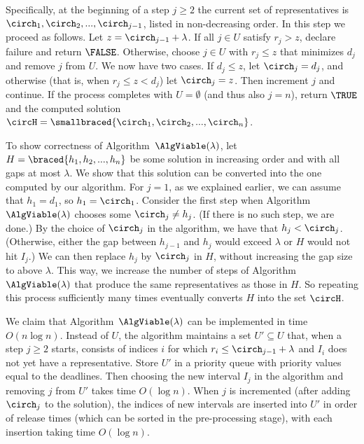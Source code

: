 Specifically, at the beginning of a step $j\ge 2$ the current set of representatives is
$\circh_1,\circh_2,...,\circh_{j-1}$, listed in non-decreasing order. In this step we proceed as follows. 
Let $z = \circh_{j-1} + \lambda$. If all $j\in U$ satisfy $r_j > z$, declare failure and return $\FALSE$.
Otherwise, choose $j\in U$ with $r_j \le z$ that minimizes $d_j$ and remove $j$ from $U$.
We now have two cases. If $d_j \le z$, let $\circh_j = d_j$, and otherwise
(that is, when $r_j \le z < d_j$) let $\circh_j = z$. Then increment $j$ and continue.
If the process completes with $U = \emptyset$ (and thus also $j=n$),
return $\TRUE$ and the computed solution $\circH = \smallbraced{\circh_1,\circh_2,...,\circh_n}$.



\medskip

To show correctness of Algorithm~$\AlgViable(\lambda)$,
let $H = \braced{ h_1, h_2, ..., h_n}$ be some solution in increasing order and
with all gaps at most $\lambda$. We show that this solution can be converted into the one computed by our algorithm.
For $j=1$, as we explained earlier, we can assume that $h_1 = d_1$, so  $h_1 = \circh_1$.
Consider the first step when Algorithm~$\AlgViable(\lambda)$ chooses some $\circh_j\neq h_j$.  (If there is no such step, we are done.)
By the choice of $\circh_j$ in the algorithm, we have that $h_j < \circh_j$.  
(Otherwise, either the gap between $h_{j-1}$ and $h_j$ would exceed $\lambda$ or $H$ would not hit $I_j$.)
We can then replace $h_j$ by $\circh_j$ in $H$, without increasing the gap
size to above $\lambda$. This way, we increase the number of steps of
Algorithm~$\AlgViable(\lambda)$ that produce the same representatives as those in $H$.
So repeating this process sufficiently many times eventually converts $H$ into the set $\circH$.

\smallskip

We claim that Algorithm~$\AlgViable(\lambda)$ can be implemented in time $O(n\log n)$. Instead of
$U$, the algorithm maintains a set $U'\subseteq U$ that, when a step $j\ge 2$ starts, consists of indices $i$ for which
$r_i \le \circh_{j-1} + \lambda$ and $I_i$ does not yet have a representative. 
Store $U'$ in a  priority queue with priority values equal to the deadlines.
Then choosing the new interval $I_j$ in the algorithm and removing $j$ from $U'$ takes time $O(\log n)$.
When $j$ is incremented (after adding $\circh_j$ to the solution), the indices of new intervals are inserted
into $U'$ in order of release times (which can be sorted in the pre-processing stage), with each insertion taking time $O(\log n)$.

